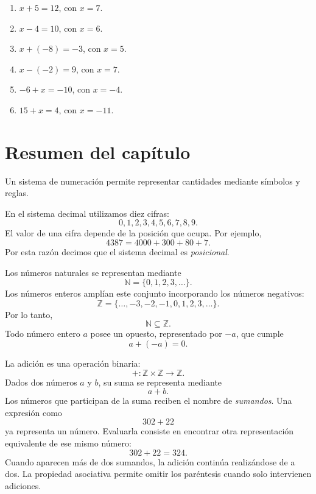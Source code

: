 \begin{enumerate}
\item \(x+5=12\), con \(x=7\).

\item \(x-4=10\), con \(x=6\).

\item \(x+(-8)=-3\), con \(x=5\).

\item \(x-(-2)=9\), con \(x=7\).

\item \(-6+x=-10\), con \(x=-4\).

\item \(15+x=4\), con \(x=-11\).
\end{enumerate}

\section{Resumen del capítulo}

\begin{tcolorbox}[resumen,title=Sistemas de numeración]
Un sistema de numeración permite representar cantidades mediante símbolos y reglas.

En el sistema decimal utilizamos diez cifras:
\[
0,1,2,3,4,5,6,7,8,9.
\]
El valor de una cifra depende de la posición que ocupa. Por ejemplo,
\[
4387=4000+300+80+7.
\]
Por esta razón decimos que el sistema decimal es \emph{posicional}.
\end{tcolorbox}

\begin{tcolorbox}[resumen,title=Números naturales y enteros]
Los números naturales se representan mediante
\[
\mathbb{N}=\{0,1,2,3,\ldots\}.
\]
Los números enteros amplían este conjunto incorporando los números negativos:
\[
\mathbb{Z}
=
\{\ldots,-3,-2,-1,0,1,2,3,\ldots\}.
\]
Por lo tanto,
\[
\mathbb{N}\subseteq\mathbb{Z}.
\]
Todo número entero \(a\) posee un opuesto, representado por \(-a\), que cumple
\[
a+(-a)=0.
\]
\end{tcolorbox}

\begin{tcolorbox}[resumen,title=Adición]
La adición es una operación binaria:
\[
+\colon\mathbb{Z}\times\mathbb{Z}\to\mathbb{Z}.
\]
Dados dos números \(a\) y \(b\), su suma se representa mediante
\[
a+b.
\]
Los números que participan de la suma reciben el nombre de \emph{sumandos}.
Una expresión como
\[
302+22
\]
ya representa un número. Evaluarla consiste en encontrar otra representación equivalente de ese mismo número:
\[
302+22=324.
\]
Cuando aparecen más de dos sumandos, la adición continúa realizándose de a dos. La propiedad asociativa permite omitir los paréntesis cuando solo intervienen adiciones.
\end{tcolorbox}

